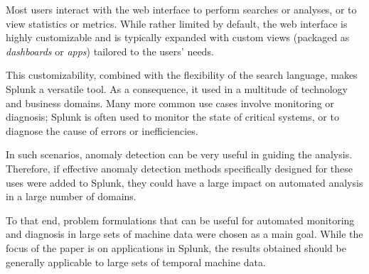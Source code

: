 Most users interact with the web interface to perform searches or analyses, or to view statistics or metrics. While rather limited by default, the web interface is highly customizable and is typically expanded with custom views (packaged as \emph{dashboards} or \emph{apps}) tailored to the users' needs.

This customizability, combined with the flexibility of the search language, makes Splunk a versatile tool. As a consequence, it  used in a multitude of technology and business domains. Many more common use cases involve monitoring or diagnosis; Splunk is often used to monitor the state of critical systems, or to diagnose the cause of errors or inefficiencies. 

In such scenarios, anomaly detection can be very useful in guiding the analysis. Therefore, if effective anomaly detection methods specifically designed for these uses were added to Splunk, they could have a large impact on automated analysis in a large number of domains.

To that end, problem formulations that can be useful for automated monitoring and diagnosis in large sets of machine data were chosen as a main goal. While the focus of the paper is on applications in Splunk, the results obtained should be generally applicable to large sets of temporal machine data.
